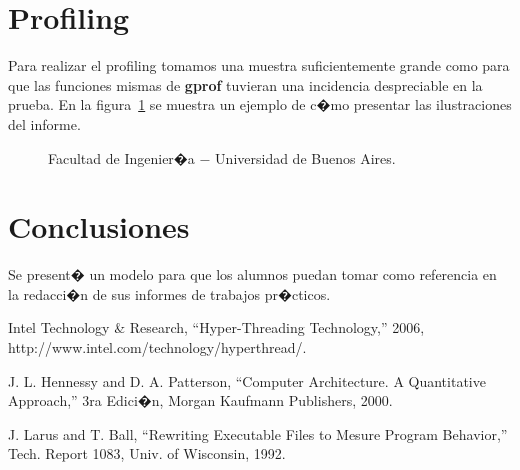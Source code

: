 \documentclass[a4paper,10pt]{article}
\begin{document}
\newpage

\section{Profiling}

Para realizar el profiling tomamos una muestra suficientemente grande como para que las funciones mismas de \textbf{gprof} tuvieran una incidencia despreciable en la prueba. 
En la figura~\ref{fig003} se muestra un ejemplo de c�mo presentar las ilustraciones del informe.

\begin{figure}[!htp]
\begin{center}
\end{center}
\caption{Facultad de Ingenier�a $-$ Universidad de Buenos Aires.} \label{fig003}
\end{figure}


\section{Conclusiones}

Se present� un modelo para que los alumnos puedan tomar como referencia en la redacci�n de sus informes de trabajos pr�cticos.


\begin{thebibliography}{99}

 Intel Technology \& Research, ``Hyper-Threading Technology,'' 2006, http://www.intel.com/technology/hyperthread/.

 J. L. Hennessy and D. A. Patterson, ``Computer Architecture. A Quantitative
Approach,'' 3ra Edici�n, Morgan Kaufmann Publishers, 2000.

 J. Larus and T. Ball, ``Rewriting Executable Files to Mesure Program Behavior,'' Tech. Report 1083, Univ. of Wisconsin, 1992.

\end{thebibliography}
\end{document}
